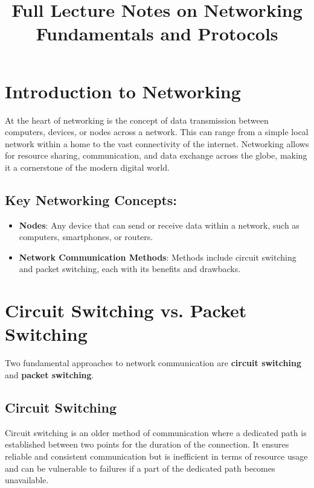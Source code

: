 \documentclass{article}
\title{Full Lecture Notes on Networking Fundamentals and Protocols}
\author{}
\date{}
\begin{document}
\maketitle
\tableofcontents

\section{Introduction to Networking}

At the heart of networking is the concept of data transmission between computers, devices, or nodes across a network. This can range from a simple local network within a home to the vast connectivity of the internet. Networking allows for resource sharing, communication, and data exchange across the globe, making it a cornerstone of the modern digital world.

\subsection{Key Networking Concepts:}

\begin{itemize}
  \item \textbf{Nodes}: Any device that can send or receive data within a network, such as computers, smartphones, or routers.
  \item \textbf{Network Communication Methods}: Methods include circuit switching and packet switching, each with its benefits and drawbacks.
\end{itemize}

\section{Circuit Switching vs. Packet Switching}

Two fundamental approaches to network communication are \textbf{circuit switching} and \textbf{packet switching}.

\subsection{Circuit Switching}

Circuit switching is an older method of communication where a dedicated path is established between two points for the duration of the connection. It ensures reliable and consistent communication but is inefficient in terms of resource usage and can be vulnerable to failures if a part of the dedicated path becomes unavailable.
\end{document}
